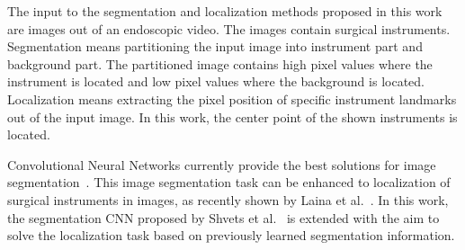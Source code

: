 The input to the segmentation and localization methods proposed in this work are images out of an endoscopic video. The images contain surgical instruments.
Segmentation means partitioning the input image into instrument part and background part. The partitioned image contains high pixel values where the instrument is located and low pixel values where the background is located.
Localization means extracting the pixel position of specific instrument landmarks out of the input image. In this work, the center point of the shown instruments is located.

Convolutional Neural Networks currently provide the best solutions for image segmentation~\cite{miccai15_results2018bodenstedt,long2015_FCNs}. This image segmentation task can be enhanced to localization of surgical instruments in images, as recently shown by Laina et al.~\cite{Laina2017}. 
In this work, the segmentation CNN proposed by Shvets et al.~\cite{Shvets2018} is extended with the aim to solve the localization task based on previously learned segmentation information.

%
